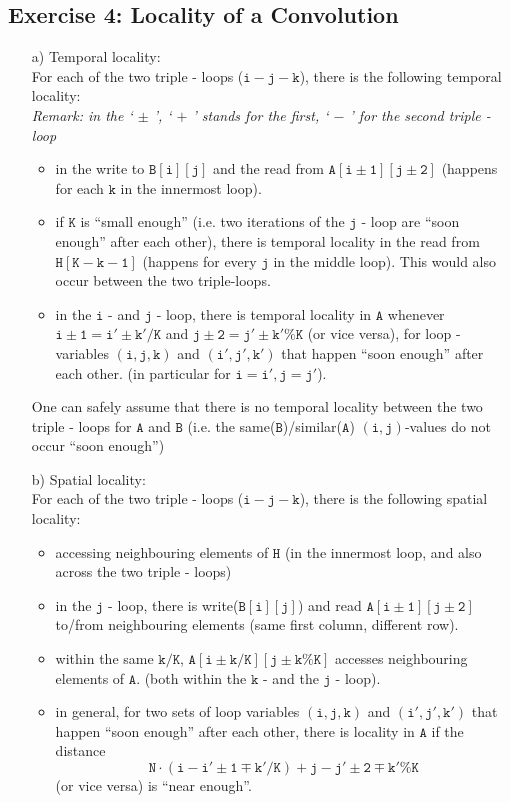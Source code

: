 \documentclass[11pt]{article}
\begin{document}
	\newpage
\subsection*{Exercise 4: Locality of a Convolution}
	\begin{itemize}
		\item[a)] Temporal locality:\\
		For each of the two triple - loops ($\mathtt{i - j- k}$), there is the following temporal locality:\\
		\emph{Remark: in the ` $\pm$ ', ` $+$ ' stands for the first, ` $-$ ' for the second triple - loop}
		\begin{itemize}
			\item in the write to $\mathtt{B[i][j]}$ and the read from $\mathtt{A[i\pm1][j\pm2]}$ (happens for each $\mathtt{k}$ in the innermost loop).
			\item if $\mathtt{K}$ is ``small enough'' (i.e. two iterations of the $\mathtt{j}$ - loop are ``soon enough'' after each other), there is temporal locality in the read from $\mathtt{H[K - k - 1]}$ (happens for every $\mathtt{j}$ in the middle loop). This would also occur between the two triple-loops.
			\item in the $\mathtt{i}$ - and $\mathtt{j}$ - loop, there is temporal locality in $\mathtt{A}$ whenever $\mathtt{i\pm1 = i' \pm k'/K}$ and $\mathtt{j \pm 2 = j' \pm k'\%K}$ (or vice versa), for loop - variables $\mathtt{(i, j, k)}$ and $\mathtt{(i', j', k')}$ that happen ``soon enough'' after each other. (in particular for $\mathtt{i = i', j = j'}$).
		\end{itemize}
		One can safely assume that there is no temporal locality between the two triple - loops for $\mathtt{A}$ and $\mathtt{B}$ (i.e. the same($\mathtt{B}$)/similar($\mathtt{A}$) $\mathtt{(i, j)}$-values do not occur ``soon enough'')
		
		\item[b)]Spatial locality:\\
		For each of the two triple - loops ($\mathtt{i - j- k}$), there is the following spatial locality:
		\begin{itemize}
		\item accessing neighbouring elements of $\mathtt{H}$ (in the innermost loop, and also across the two triple - loops)
		\item in the $\mathtt{j}$ - loop, there is write($\mathtt{B[i][j]}$) and read $\mathtt{A[i \pm 1][j \pm 2]}$ to/from neighbouring elements (same first column, different row).
		\item within the same $\mathtt{k/K}$, $\mathtt{A[i\pm k / K][j\pm k\%K]}$ accesses neighbouring elements of $\mathtt{A}$. (both within the $\mathtt{k}$ - and the $\mathtt{j}$ - loop).
		\item in general, for two sets of loop variables $\mathtt{(i, j, k)}$ and $\mathtt{(i', j', k')}$ that happen ``soon enough'' after each other, there is locality in $\mathtt{A}$ if the distance \[ \mathtt{N \cdot (i - i' \pm 1 \mp k'/K) + j - j' \pm 2 \mp k'\%K} \]
		(or vice versa) is ``near enough''. 
		\end{itemize}
	\end{itemize}
\end{document}
